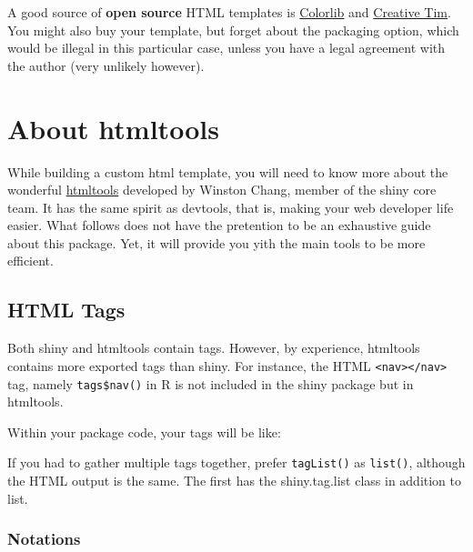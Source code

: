 \documentclass[]{book}
\newenvironment{Shaded}{\begin{snugshade}}{\end{snugshade}}
\newcommand{\CommentTok}[1]{\textcolor[rgb]{0.56,0.35,0.01}{\textit{#1}}}
\newcommand{\KeywordTok}[1]{\textcolor[rgb]{0.13,0.29,0.53}{\textbf{#1}}}
\newcommand{\NormalTok}[1]{#1}
\newcommand{\OperatorTok}[1]{\textcolor[rgb]{0.81,0.36,0.00}{\textbf{#1}}}
\begin{document}
A good source of \textbf{open source} HTML templates is \href{https://colorlib.com}{Colorlib} and \href{https://www.creative-tim.com/bootstrap-themes/free}{Creative Tim}. You might also buy your template, but forget about the packaging option, which would be illegal in this particular case, unless you have a legal agreement with the author (very unlikely however).

\hypertarget{about-htmltools}{%
\section{About htmltools}\label{about-htmltools}}

While building a custom html template, you will need to know more about the wonderful \href{https://github.com/rstudio/htmltools}{htmltools} developed by Winston Chang, member of the shiny core team. It has the same spirit as devtools, that is, making your web developer life easier. What follows does not have the pretention to be an exhaustive guide about this package. Yet, it will provide you yith the main
tools to be more efficient.

\hypertarget{html-tags}{%
\subsection{HTML Tags}\label{html-tags}}

Both shiny and htmltools contain tags. However, by experience, htmltools contains more exported tags than shiny.
For instance, the HTML \texttt{\textless{}nav\textgreater{}\textless{}/nav\textgreater{}} tag, namely \texttt{tags\$nav()} in R is not included in the shiny package but
in htmltools.

Within your package code, your tags will be like:

\begin{Shaded}
\end{Shaded}

If you had to gather multiple tags together, prefer \texttt{tagList()} as \texttt{list()}, although the HTML output is the same. The first
has the shiny.tag.list class in addition to list.

\hypertarget{notations}{%
\subsubsection{Notations}\label{notations}}
\end{document}
